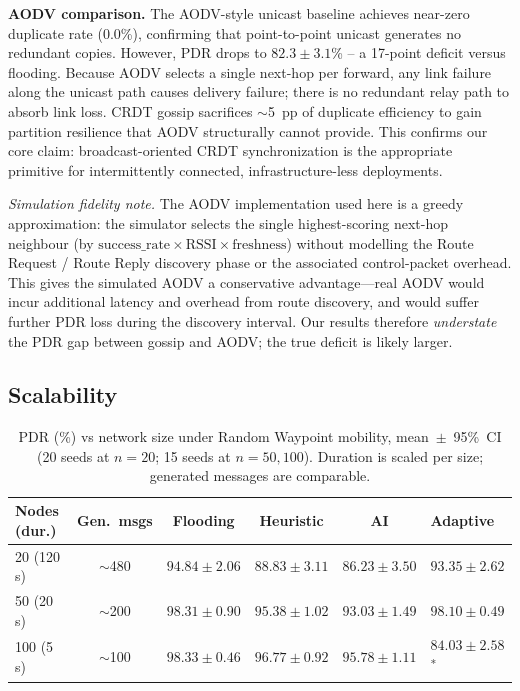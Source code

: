 \documentclass[conference]{IEEEtran}
\begin{document}
\textbf{AODV comparison.}  The AODV-style unicast baseline achieves near-zero
duplicate rate (0.0\%), confirming that point-to-point unicast generates no
redundant copies.  However, PDR drops to $82.3\pm3.1$\% -- a 17-point deficit
versus flooding.  Because AODV selects a single next-hop per forward, any link
failure along the unicast path causes delivery failure; there is no redundant
relay path to absorb link loss.  CRDT gossip sacrifices $\sim$5~pp of duplicate
efficiency to gain partition resilience that AODV structurally cannot provide.
This confirms our core claim: broadcast-oriented CRDT synchronization is the
appropriate primitive for intermittently connected, infrastructure-less
deployments.

\textit{Simulation fidelity note.}  The AODV implementation used here is a
greedy approximation: the simulator selects the single highest-scoring
next-hop neighbour (by $\text{success\_rate} \times \text{RSSI} \times
\text{freshness}$) without modelling the Route Request / Route Reply discovery
phase or the associated control-packet overhead.  This gives the simulated AODV
a conservative advantage---real AODV would incur additional latency and overhead
from route discovery, and would suffer further PDR loss during the discovery
interval.  Our results therefore \emph{understate} the PDR gap between gossip
and AODV; the true deficit is likely larger.

\subsection{Scalability}
\label{ssec:scalability}

\begin{table}[!t]
  \centering
  \caption{PDR (\%) vs network size under Random Waypoint mobility,
           mean~$\pm$~95\%~CI (20 seeds at $n=20$; 15 seeds at $n=50,100$).
           Duration is scaled per size; generated messages are comparable.}
  \label{tab:scalability}
  \begin{tabular}{lcccc}
    \toprule
    \textbf{Nodes (dur.)} & \textbf{Gen.~msgs} & \textbf{Flooding} & \textbf{Heuristic} & \textbf{AI} & \textbf{Adaptive} \\
      (120\,s) & $\sim$480  & $94.84\pm2.06$ & $88.83\pm3.11$ & $86.23\pm3.50$ & $93.35\pm2.62$ \\
    50  (20\,s)  & $\sim$200  & $98.31\pm0.90$ & $95.38\pm1.02$ & $93.03\pm1.49$ & $98.10\pm0.49$ \\
    100 (5\,s)   & $\sim$100  & $98.33\pm0.46$ & $96.77\pm0.92$ & $95.78\pm1.11$ & $84.03\pm2.58$\textsuperscript{*} \\
    \bottomrule
  \end{tabular}
\end{table}
\end{document}
